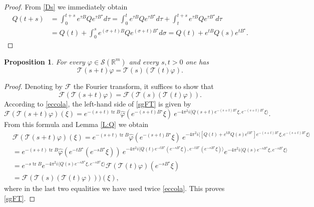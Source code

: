 \documentclass[11pt,a4paper]{amsart}
\def \vf{\varphi}
\newcommand{\Rm}{\mathbb R^m}
\numberwithin{equation}{section}
\newcommand{\tr}{\operatorname{tr}}
\newcommand{\sa}{\langle}
\newcommand{\da}{\rangle}
\newtheorem{proposition}[theorem]{Proposition}
\numberwithin{equation}{section}
\begin{document}
\begin{proof}
From \eqref{Ds} we immediately obtain
\begin{align*}
Q(t+s) & = \int_0^{t+s} e^{\tau B}Q e^{\tau B^\star} d\tau
 = \int_0^{t} e^{\tau B}Q e^{\tau B^\star} d\tau + \int_t^{t+s} e^{\tau B}Q e^{\tau B^\star} d\tau
 \\
 & = Q(t) + \int_0^{s} e^{(\sigma + t) B}Q e^{(\sigma + t) B^\star} d\sigma = Q(t) + e^{tB} Q(s) e^{tB^\star}.
\end{align*}


\end{proof}


\begin{proposition}\label{P:sg}
For every $\vf\in \mathscr S(\Rm)$ and every $s, t >0$ one has
\begin{equation}\label{sgp}
\mathcal T(s+t)\vf = \mathcal T(s)(\mathcal T(t) \vf).
\end{equation}
\end{proposition}

\begin{proof}
Denoting by $\mathscr F$ the Fourier transform, it suffices to show that
\begin{equation}\label{sgFT}
\mathscr F(\mathcal T(s+t)\vf) = \mathscr F(\mathcal T(s)(\mathcal T(t) \vf)).
\end{equation}
According to \eqref{eccola}, the left-hand side of \eqref{sgFT} is given by
\[
\mathscr F(\mathcal T(s+t)\vf)(\xi) = e^{-(s+t) \tr B} \hat \vf(e^{-(s+t)B^\star}\xi) \  e^{-4\pi^2 i  \sa Q(s+t) e^{-(s+t)B^\star}\xi,e^{-(s+t)B^\star}\xi\da}.
\]
From this formula and Lemma \ref{L:Q} we obtain
\begin{align*}
& \mathscr F(\mathcal T(s+t)\vf)(\xi) = e^{-(s+t) \tr B} \hat \vf(e^{-(s+t)B^\star}\xi) \  e^{-4\pi^2 i  \sa [Q(t) + e^{tB} Q(s) e^{tB^\star}] e^{-(s+t)B^\star}\xi,e^{-(s+t)B^\star}\xi\da}
\\
& = e^{-(s+t) \tr B} \hat \vf(e^{-tB^\star}(e^{-sB^\star}\xi)) \  e^{-4\pi^2 i  \sa Q(t)e^{-tB^\star}(e^{-sB^\star} \xi),e^{-tB^\star}(e^{-sB^\star} \xi)\da} e^{-4\pi^2 i  \sa Q(s) e^{-sB^\star}\xi,e^{-sB^\star}\xi\da}
\\
& = e^{-s \tr B} e^{-4\pi^2 i  \sa Q(s) e^{-sB^\star}\xi,e^{-sB^\star}\xi\da} \mathscr F(\mathcal T(t)\vf)(e^{-sB^\star} \xi)
\\
& = \mathscr F(\mathcal T(s)(\mathcal T(t)\vf)))(\xi),
\end{align*}
where in the last two equalities we have used twice \eqref{eccola}. This proves \eqref{sgFT}.


\end{proof} 
\end{document}
